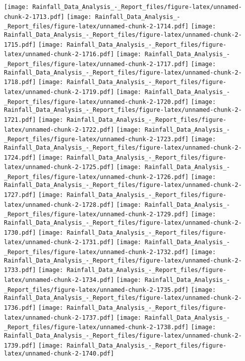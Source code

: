 \documentclass[
]{article}
\begin{document}
\texttt{[image: Rainfall\_Data\_Analysis\_-\_Report\_files/figure-latex/unnamed-chunk-2-1713.pdf]}
\texttt{[image: Rainfall\_Data\_Analysis\_-\_Report\_files/figure-latex/unnamed-chunk-2-1714.pdf]}
\texttt{[image: Rainfall\_Data\_Analysis\_-\_Report\_files/figure-latex/unnamed-chunk-2-1715.pdf]}
\texttt{[image: Rainfall\_Data\_Analysis\_-\_Report\_files/figure-latex/unnamed-chunk-2-1716.pdf]}
\texttt{[image: Rainfall\_Data\_Analysis\_-\_Report\_files/figure-latex/unnamed-chunk-2-1717.pdf]}
\texttt{[image: Rainfall\_Data\_Analysis\_-\_Report\_files/figure-latex/unnamed-chunk-2-1718.pdf]}
\texttt{[image: Rainfall\_Data\_Analysis\_-\_Report\_files/figure-latex/unnamed-chunk-2-1719.pdf]}
\texttt{[image: Rainfall\_Data\_Analysis\_-\_Report\_files/figure-latex/unnamed-chunk-2-1720.pdf]}
\texttt{[image: Rainfall\_Data\_Analysis\_-\_Report\_files/figure-latex/unnamed-chunk-2-1721.pdf]}
\texttt{[image: Rainfall\_Data\_Analysis\_-\_Report\_files/figure-latex/unnamed-chunk-2-1722.pdf]}
\texttt{[image: Rainfall\_Data\_Analysis\_-\_Report\_files/figure-latex/unnamed-chunk-2-1723.pdf]}
\texttt{[image: Rainfall\_Data\_Analysis\_-\_Report\_files/figure-latex/unnamed-chunk-2-1724.pdf]}
\texttt{[image: Rainfall\_Data\_Analysis\_-\_Report\_files/figure-latex/unnamed-chunk-2-1725.pdf]}
\texttt{[image: Rainfall\_Data\_Analysis\_-\_Report\_files/figure-latex/unnamed-chunk-2-1726.pdf]}
\texttt{[image: Rainfall\_Data\_Analysis\_-\_Report\_files/figure-latex/unnamed-chunk-2-1727.pdf]}
\texttt{[image: Rainfall\_Data\_Analysis\_-\_Report\_files/figure-latex/unnamed-chunk-2-1728.pdf]}
\texttt{[image: Rainfall\_Data\_Analysis\_-\_Report\_files/figure-latex/unnamed-chunk-2-1729.pdf]}
\texttt{[image: Rainfall\_Data\_Analysis\_-\_Report\_files/figure-latex/unnamed-chunk-2-1730.pdf]}
\texttt{[image: Rainfall\_Data\_Analysis\_-\_Report\_files/figure-latex/unnamed-chunk-2-1731.pdf]}
\texttt{[image: Rainfall\_Data\_Analysis\_-\_Report\_files/figure-latex/unnamed-chunk-2-1732.pdf]}
\texttt{[image: Rainfall\_Data\_Analysis\_-\_Report\_files/figure-latex/unnamed-chunk-2-1733.pdf]}
\texttt{[image: Rainfall\_Data\_Analysis\_-\_Report\_files/figure-latex/unnamed-chunk-2-1734.pdf]}
\texttt{[image: Rainfall\_Data\_Analysis\_-\_Report\_files/figure-latex/unnamed-chunk-2-1735.pdf]}
\texttt{[image: Rainfall\_Data\_Analysis\_-\_Report\_files/figure-latex/unnamed-chunk-2-1736.pdf]}
\texttt{[image: Rainfall\_Data\_Analysis\_-\_Report\_files/figure-latex/unnamed-chunk-2-1737.pdf]}
\texttt{[image: Rainfall\_Data\_Analysis\_-\_Report\_files/figure-latex/unnamed-chunk-2-1738.pdf]}
\texttt{[image: Rainfall\_Data\_Analysis\_-\_Report\_files/figure-latex/unnamed-chunk-2-1739.pdf]}
\texttt{[image: Rainfall\_Data\_Analysis\_-\_Report\_files/figure-latex/unnamed-chunk-2-1740.pdf]}
\end{document}
